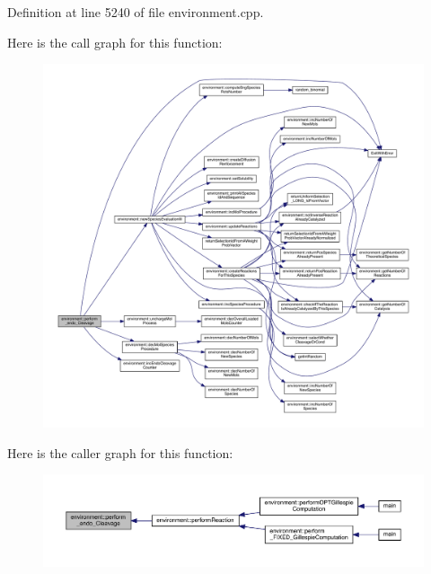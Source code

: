 Definition at line 5240 of file environment.\-cpp.



Here is the call graph for this function\-:
\nopagebreak
\begin{figure}[H]
\begin{center}
\leavevmode
\includegraphics[width=350pt]{a00014_ade26b82a3b48a5bda7e5751cbfd31b04_cgraph}
\end{center}
\end{figure}




Here is the caller graph for this function\-:
\nopagebreak
\begin{figure}[H]
\begin{center}
\leavevmode
\includegraphics[width=350pt]{a00014_ade26b82a3b48a5bda7e5751cbfd31b04_icgraph}
\end{center}
\end{figure}


